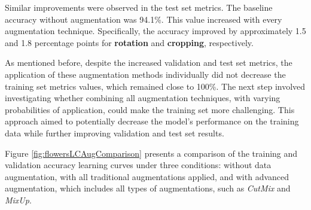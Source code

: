 Similar improvements were observed in the test set metrics. The baseline accuracy without augmentation was 94.1\%. This value increased with every augmentation technique. Specifically, the accuracy improved by approximately 1.5 and 1.8 percentage points for \textbf{rotation} and \textbf{cropping}, respectively.

As mentioned before, despite the increased validation and test set metrics, the application of these augmentation methods individually did not decrease the training set metrics values, which remained close to 100\%. The next step involved investigating whether combining all augmentation techniques, with varying probabilities of application, could make the training set more challenging. This approach aimed to potentially decrease the model's performance on the training data while further improving validation and test set results.

Figure \ref{fig:flowersLCAugComparison} presents a comparison of the training and validation accuracy learning curves under three conditions: without data augmentation, with all traditional augmentations applied, and with advanced augmentation, which includes all types of augmentations, such as \textit{CutMix} and \textit{MixUp}.

